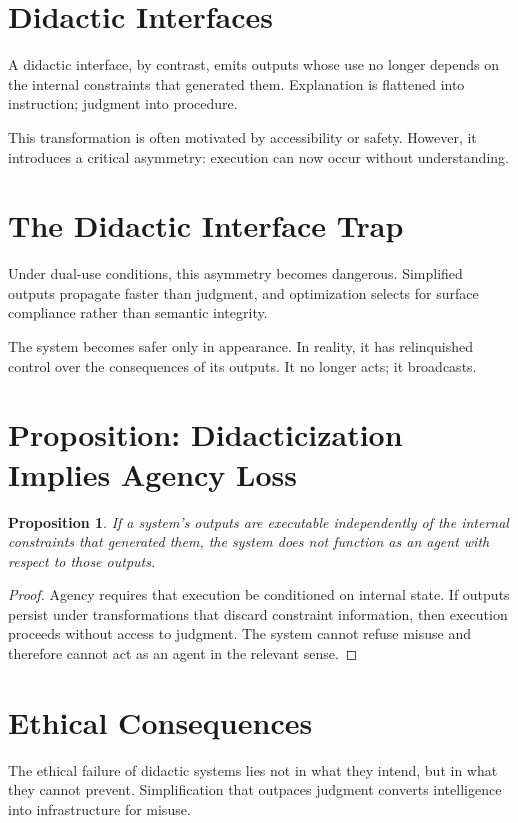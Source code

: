 \documentclass[12pt]{article}
\newtheorem{proposition}{Proposition}
\begin{document}
\section{Didactic Interfaces}

A didactic interface, by contrast, emits outputs whose use no longer depends on the internal constraints that generated them. Explanation is flattened into instruction; judgment into procedure.

This transformation is often motivated by accessibility or safety. However, it introduces a critical asymmetry: execution can now occur without understanding.

\section{The Didactic Interface Trap}

Under dual-use conditions, this asymmetry becomes dangerous. Simplified outputs propagate faster than judgment, and optimization selects for surface compliance rather than semantic integrity.

The system becomes safer only in appearance. In reality, it has relinquished control over the consequences of its outputs. It no longer acts; it broadcasts.

\section{Proposition: Didacticization Implies Agency Loss}

\begin{proposition}
If a system’s outputs are executable independently of the internal constraints that generated them, the system does not function as an agent with respect to those outputs.
\end{proposition}

\begin{proof}
Agency requires that execution be conditioned on internal state. If outputs persist under transformations that discard constraint information, then execution proceeds without access to judgment. The system cannot refuse misuse and therefore cannot act as an agent in the relevant sense.
\end{proof}

\section{Ethical Consequences}

The ethical failure of didactic systems lies not in what they intend, but in what they cannot prevent. Simplification that outpaces judgment converts intelligence into infrastructure for misuse.
\end{document}
